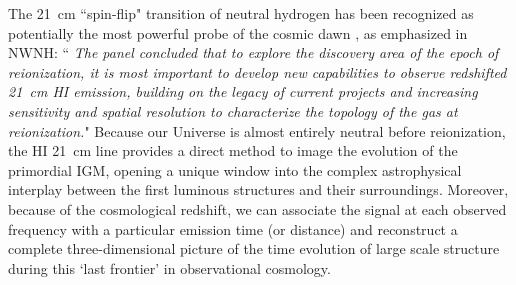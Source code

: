 \documentclass[preprint]{aastex}
\def\HI{{H{\small I }}}
\begin{document}
The 21~cm ``spin-flip" transition of  neutral hydrogen has been recognized as potentially the most powerful probe 
of the cosmic dawn \citep{morales_wyithe2010, furlanetto_et_al2006}, as emphasized in NWNH: 
``{\it 
The panel concluded that  to explore the discovery area of the epoch of reionization, it is most important to 
develop new capabilities to observe redshifted 21~cm \HI emission, building on the legacy of current projects and 
increasing sensitivity and spatial resolution to characterize the topology of the gas at reionization.}"  Because 
our Universe is almost entirely neutral before reionization, the HI 21~cm line provides a direct method to image 
the evolution of the primordial IGM, opening a unique window into the complex astrophysical interplay between the 
first luminous structures and their surroundings. Moreover, because of the cosmological redshift, we can associate 
the signal at each observed frequency with a particular emission time (or distance) and reconstruct a complete 
three-dimensional picture of the time evolution of large scale structure during this `last frontier' in 
observational cosmology. 

\end{document}
